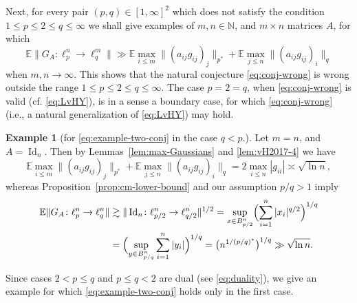 \documentclass[a4paper]{amsart}
\theoremstyle{definition}
\newtheorem{example}[theorem]{Example}
\theoremstyle{remark}
\numberwithin{equation}{section}
\newcommand*{\NN}{\mathbb{N}}
\newcommand*{\EE}{\mathbb{E}}
\begin{document}
Next, for every pair $(p,q)\in [1,\infty]^2$ which does not satisfy the condition $1\le p\le 2\le q\le \infty$ we shall give  examples of $m,n\in \NN$, and  $m\times n$ matrices $A$, for which
\begin{equation} \label{eq:example-two-conj}
	 \EE \|G_A\colon \ell_{p}^n\to\ell_q^m\| \gg \EE\max_{i\le m} \| (a_{ij}g_{ij})_j\|_{p^\ast} +\EE\max_{j\le n}  \| (a_{ij}g_{ij})_i\|_q
\end{equation}
when $m,n \to \infty$. This shows that the natural conjecture \eqref{eq:conj-wrong} is wrong outside the range $1\le p\le 2\le q\le \infty$. 
The case $p=2=q$, when \eqref{eq:conj-wrong} is valid (cf. \eqref{eq:LvHY}), is in a sense a boundary case, for which \eqref{eq:conj-wrong} (i.e., a natural generalization of \eqref{eq:LvHY}) may hold.

\begin{example} [for \eqref{eq:example-two-conj} in the case $q<p$.]
	Let $m=n$, and $A=\operatorname{Id}_n$. 
	Then by Lemmas~\ref{lem:max-Gaussians} and \ref{lem:vH2017-4} we have
	\[
		\EE\max_{i\le m} \| (a_{ij}g_{ij})_j\|_{p^\ast} +\EE\max_{j\le n}  \| (a_{ij}g_{ij})_i\|_q = 2 \max_{i\le n} |g_{ii}| \asymp \sqrt{\ln  n},
	\]
	whereas Proposition~\ref{prop:cm-lower-bound} and our assumption $p/q>1$ imply
	\begin{align*}
		 \EE \|G_A\colon \ell_{p}^n\to\ell_q^n\| &\gtrsim \|\operatorname{Id}_n \colon \ell_{p/2}^n \to \ell_{q /2}^n \|^{1/2} = \sup_{x\in B_{p/2}^n}  \Bigl( \sum_{i=1}^n |x_i|^{q/2} \Bigr)^{1/q}
		\\
		&=   \Bigl(  \sup_{y\in B_{p/q}^n} \sum_{i=1}^n |y_i| \Bigr)^{1/q} = \bigl( n^{1/(p/q)^*} \bigr)^{1/q}  \gg \sqrt{\ln n}.
	\end{align*}
\end{example}

Since cases $2<p \le q$ and $p\le q <2$ are dual (see \eqref{eq:duality}), we give an example for which  \eqref{eq:example-two-conj} holds only in the first case.
\end{document}
